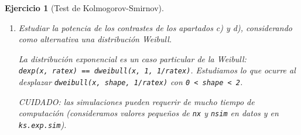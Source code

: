 \documentclass[
]{book}
\newenvironment{Shaded}{\begin{snugshade}}{\end{snugshade}}
\newcommand{\AttributeTok}[1]{\textcolor[rgb]{0.77,0.63,0.00}{#1}}
\newcommand{\CommentTok}[1]{\textcolor[rgb]{0.56,0.35,0.01}{\textit{#1}}}
\newcommand{\ControlFlowTok}[1]{\textcolor[rgb]{0.13,0.29,0.53}{\textbf{#1}}}
\newcommand{\DecValTok}[1]{\textcolor[rgb]{0.00,0.00,0.81}{#1}}
\newcommand{\FloatTok}[1]{\textcolor[rgb]{0.00,0.00,0.81}{#1}}
\newcommand{\FunctionTok}[1]{\textcolor[rgb]{0.00,0.00,0.00}{#1}}
\newcommand{\NormalTok}[1]{#1}
\newcommand{\OtherTok}[1]{\textcolor[rgb]{0.56,0.35,0.01}{#1}}
\newcommand{\SpecialCharTok}[1]{\textcolor[rgb]{0.00,0.00,0.00}{#1}}
\newcommand{\StringTok}[1]{\textcolor[rgb]{0.31,0.60,0.02}{#1}}
\theoremstyle{break}
\newtheorem{exercise}{Ejercicio}[chapter]
\theoremstyle{nonumberplain}
\renewcommand{\CommentTok}[1]{\textcolor[rgb]{0.41,0.41,0.41}{\texttt{#1}}}
\begin{document}
\begin{exercise}[Test de Kolmogorov-Smirnov]
\begin{enumerate}
  \begin{center}\texttt{[image: 07-Monte\_Carlo\_files/figure-latex/unnamed-chunk-59-1]} \texttt{[image: 07-Monte\_Carlo\_files/figure-latex/unnamed-chunk-59-2]} \end{center}
\item
  Estudiar la potencia de los contrastes de los apartados c) y d),
  considerando como alternativa una distribución Weibull.

  La distribución exponencial es un caso particular de la Weibull:
  \texttt{dexp(x,\ ratex)\ ==\ dweibull(x,\ 1,\ 1/ratex)}.
  Estudiamos lo que ocurre al desplazar \texttt{dweibull(x,\ shape,\ 1/ratex)} con \texttt{0\ \textless{}\ shape\ \textless{}\ 2}.

  CUIDADO: las simulaciones pueden requerir de mucho tiempo de computación
  (consideramos valores pequeños de \texttt{nx} y \texttt{nsim} en datos y en \texttt{ks.exp.sim}).

\begin{Shaded}
\end{Shaded}
\end{enumerate}
\end{exercise}
\end{document}
